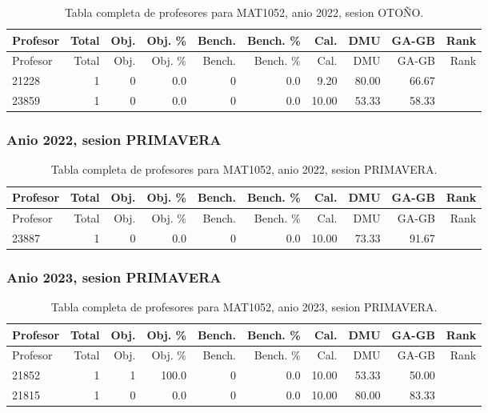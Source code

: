 \begingroup
\scriptsize
\setlength{\tabcolsep}{3pt}
\begin{longtable}{lrrrrrrrrr}
\caption{Tabla completa de profesores para MAT1052, anio 2022, sesion OTOÑO.}\label{tab:prof-period-mat1052-2022-oto-o}\\
\toprule
Profesor & Total & Obj. & Obj. \% & Bench. & Bench. \% & Cal. & DMU & GA-GB & Rank \\
\midrule
\endfirsthead
\toprule
Profesor & Total & Obj. & Obj. \% & Bench. & Bench. \% & Cal. & DMU & GA-GB & Rank \\
\midrule
\endhead
21228 & 1 & 0 & 0.0 & 0 & 0.0 & 9.20 & 80.00 & 66.67 &  \\
23859 & 1 & 0 & 0.0 & 0 & 0.0 & 10.00 & 53.33 & 58.33 &  \\
\bottomrule
\end{longtable}
\endgroup

\subsubsection{Anio 2022, sesion PRIMAVERA}

\begingroup
\scriptsize
\setlength{\tabcolsep}{3pt}
\begin{longtable}{lrrrrrrrrr}
\caption{Tabla completa de profesores para MAT1052, anio 2022, sesion PRIMAVERA.}\label{tab:prof-period-mat1052-2022-primavera}\\
\toprule
Profesor & Total & Obj. & Obj. \% & Bench. & Bench. \% & Cal. & DMU & GA-GB & Rank \\
\midrule
\endfirsthead
\toprule
Profesor & Total & Obj. & Obj. \% & Bench. & Bench. \% & Cal. & DMU & GA-GB & Rank \\
\midrule
\endhead
23887 & 1 & 0 & 0.0 & 0 & 0.0 & 10.00 & 73.33 & 91.67 &  \\
\bottomrule
\end{longtable}
\endgroup

\subsubsection{Anio 2023, sesion PRIMAVERA}

\begingroup
\scriptsize
\setlength{\tabcolsep}{3pt}
\begin{longtable}{lrrrrrrrrr}
\caption{Tabla completa de profesores para MAT1052, anio 2023, sesion PRIMAVERA.}\label{tab:prof-period-mat1052-2023-primavera}\\
\toprule
Profesor & Total & Obj. & Obj. \% & Bench. & Bench. \% & Cal. & DMU & GA-GB & Rank \\
\midrule
\endfirsthead
\toprule
Profesor & Total & Obj. & Obj. \% & Bench. & Bench. \% & Cal. & DMU & GA-GB & Rank \\
\midrule
\endhead
21852 & 1 & 1 & 100.0 & 0 & 0.0 & 10.00 & 53.33 & 50.00 &  \\
21815 & 1 & 0 & 0.0 & 0 & 0.0 & 10.00 & 80.00 & 83.33 &  \\
\bottomrule
\end{longtable}
\endgroup

